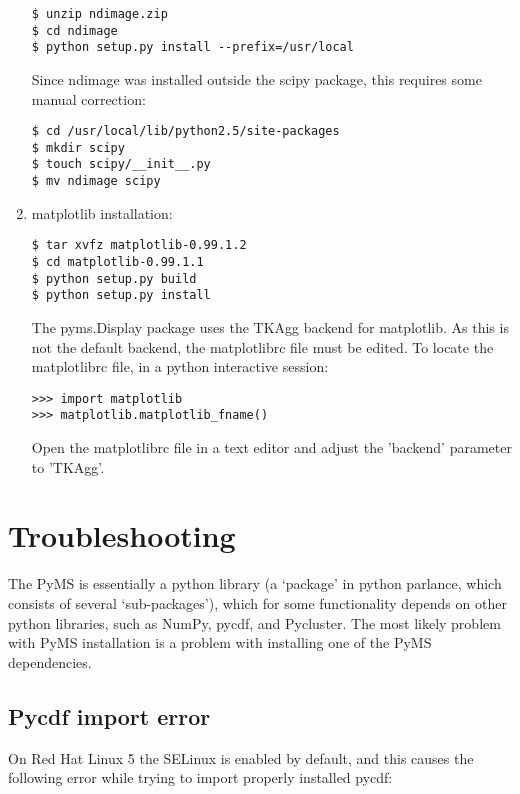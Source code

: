\begin{enumerate}
\begin{verbatim}
$ unzip ndimage.zip
$ cd ndimage
$ python setup.py install --prefix=/usr/local
\end{verbatim}

\noindent
Since ndimage was installed outside the scipy package, this requires some manual
correction:

\begin{verbatim}
$ cd /usr/local/lib/python2.5/site-packages
$ mkdir scipy
$ touch scipy/__init__.py
$ mv ndimage scipy
\end{verbatim}

\item matplotlib installation:

\begin{verbatim}
$ tar xvfz matplotlib-0.99.1.2
$ cd matplotlib-0.99.1.1
$ python setup.py build
$ python setup.py install
\end{verbatim}

\noindent
The pyms.Display package uses the TKAgg backend for matplotlib. As this is
not the default backend, the matplotlibrc file must be edited. To locate the
matplotlibrc file, in a python interactive session:

\begin{verbatim}
>>> import matplotlib
>>> matplotlib.matplotlib_fname()
\end{verbatim}

\noindent
Open the matplotlibrc file in a text editor and adjust the 'backend'
parameter to 'TKAgg'.

\end{enumerate}

\section{Troubleshooting}

The PyMS is essentially a python library (a `package' in python parlance, which
consists of several `sub-packages'), which for some functionality depends on
other python libraries, such as NumPy, pycdf, and Pycluster. The most likely
problem with PyMS installation is a problem with installing one of the PyMS
dependencies.

\subsection{Pycdf import error}

On Red Hat Linux 5 the SELinux is enabled by default, and this causes the
following error while trying to import properly installed pycdf:

